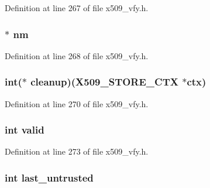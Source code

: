 Definition at line 267 of file x509\+\_\+vfy.\+h.

\subsubsection[{\texorpdfstring{nm}{nm}}]{ $\ast$ nm}\hypertarget{structx509__store__ctx__st_a57a3541601842982e910946c748942ca}{}\label{structx509__store__ctx__st_a57a3541601842982e910946c748942ca}


Definition at line 268 of file x509\+\_\+vfy.\+h.

\subsubsection[{\texorpdfstring{cleanup}{cleanup}}]{\setlength{\rightskip}{0pt plus 5cm}int($\ast$ cleanup)({\bf X509\+\_\+\+S\+T\+O\+R\+E\+\_\+\+C\+TX} $\ast${\bf ctx})}\hypertarget{structx509__store__ctx__st_a03a57d8a8f4971f2c51d152996d5a986}{}\label{structx509__store__ctx__st_a03a57d8a8f4971f2c51d152996d5a986}


Definition at line 270 of file x509\+\_\+vfy.\+h.

\subsubsection[{\texorpdfstring{valid}{valid}}]{\setlength{\rightskip}{0pt plus 5cm}int valid}\hypertarget{structx509__store__ctx__st_ac63b1f168765a53e565a8ba27f5469d1}{}\label{structx509__store__ctx__st_ac63b1f168765a53e565a8ba27f5469d1}


Definition at line 273 of file x509\+\_\+vfy.\+h.

\subsubsection[{\texorpdfstring{last\+\_\+untrusted}{last_untrusted}}]{\setlength{\rightskip}{0pt plus 5cm}int last\+\_\+untrusted}\hypertarget{structx509__store__ctx__st_a15b547649c8d99ff4999baf8a245327e}{}\label{structx509__store__ctx__st_a15b547649c8d99ff4999baf8a245327e}


